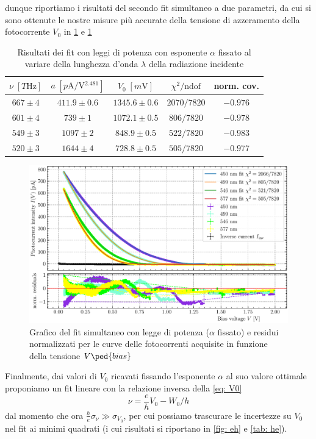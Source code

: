 \documentclass[10pt, a4paper, italian]{article}
\begin{document}
dunque riportiamo i risultati del secondo fit simultaneo a due parametri, da
cui si sono ottenute le nostre misure più accurate della tensione di
azzeramento della fotocorrente $V_0$ in \cref{tab: inp} e \cref{fig: inp}
\begin{table}
\centering
\begin{tabular}{ccccc}
\toprule
$\nu \; [\si{T\Hz}]$ & $a \; [\si{p\A/\V^{2.481}}] $ & $V_0 \; [\si{m\V}]$ &
$\chi^2/\text{ndof}$ & norm. cov. \\
\midrule
$667 \pm 4$ & $411.9 \pm 0.6$ & $1345.6 \pm 0.6$ & $2070/7820$ & $-0.976$ \\
$601 \pm 4$ & $739 \pm 1$ & $1072.1 \pm 0.5$ & $806/7820$ & $-0.978$ \\
$549 \pm 3$ & $1097 \pm 2$ & $848.9 \pm 0.5$ & $522/7820$ & $-0.983$ \\
$520 \pm 3$ & $1644 \pm 4$ & $728.8 \pm 0.5$ & $505/7820$ & $-0.977$ \\
\bottomrule
\end{tabular}
\caption{Risultati dei fit con leggi di potenza con esponente $\alpha$ fissato
al variare della lunghezza d'onda $\lambda$ della radiazione incidente
\label{tab: inp}}
\end{table}

\begin{figure}[htbp]
    \centering
	\includegraphics[width=\textwidth]{inp}
    \caption{Grafico del fit simultaneo con legge di potenza ($\alpha$ fissato)
    e residui normalizzati per le curve delle fotocorrenti acquisite in
    funzione della tensione $V\ped{bias}$
    \label{fig: inp}}
\end{figure}

Finalmente, dai valori di $V_0$ ricavati fissando l'esponente $\alpha$ al suo
valore ottimale proponiamo un fit lineare con la relazione inversa della
\cref{eq: V0}
\begin{equation}\label{eq: eh}
\nu = \frac{e}{h} V_0 - W_0/h
\end{equation}
dal momento che ora $\frac{h}{e} \sigma_\nu \gg \sigma_{V_0}$, per cui
possiamo trascurare le incertezze su $V_0$ nel fit ai minimi quadrati
(i cui risultati si riportano in \cref{fig: eh} e \cref{tab: he}).
\end{document}
